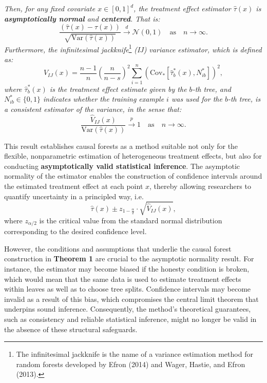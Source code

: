 \documentclass[
  12pt,
  a4paper,
  oneside]{article}
\begin{document}
\textit{Then, for any fixed covariate $x \in [0,1]^d$, the treatment effect estimator $\hat{\tau}(x)$ is \textbf{asymptotically normal} and \textbf{centered}. That is:}
\begin{equation} \label{eq:5}
\frac{\left(\hat{\tau}(x) - \tau(x)\right)}{\sqrt{\text{Var}\left(\hat{\tau}(x)\right)}} \xrightarrow{d} \mathcal{N}(0,1) \quad \text{as} \quad n \to \infty.
\end{equation}
\textit{Furthermore, the infinitesimal jackknife}\footnote{The
  infinitesimal jackknife is the name of a variance estimation method
  for random forests developed by Efron (2014) and Wager, Hastie, and
  Efron (2013).} \textit{(IJ) variance estimator, which is defined as:}
\begin{equation} \label{eq:6}
\hat{V}_{IJ}(x) = \frac{n-1}{n}\left(\frac{n}{n-s}\right)^2 \sum_{i=1}^{n} \left(\text{Cov}_{\ast}\left[\hat{\tau}^{\ast}_{b}(x), N_{ib}^{\ast}\right]\right)^2,
\end{equation}
\textit{where $\hat{\tau}^{\ast}_b(x)$ is the treatment effect estimate given by the $b$-th tree, and $N_{ib}^{\ast} \in \{0,1\}$ indicates whether the training example $i$ was used for the $b$-th tree, is a consistent estimator of the variance, in the sense that:}
\begin{equation} \label{eq:7}
\frac{\hat{V}_{IJ}(x)}{\text{Var}(\hat{\tau}(x))} \xrightarrow{p} 1
\quad \text{as} \quad n \to \infty.
\end{equation}

\qquad This result establishes causal forests as a method suitable not
only for the flexible, nonparametric estimation of heterogeneous
treatment effects, but also for conducting
\textbf{asymptotically valid statistical inference}. The asymptotic
normality of the estimator enables the construction of confidence
intervals around the estimated treatment effect at each point \(x\),
thereby allowing researchers to quantify uncertainty in a principled
way, i.e. \begin{equation} \label{eq:8}
\hat{\tau}(x) \pm z_{1 - \frac{\alpha}{2}} \cdot \sqrt{\hat{V}_{IJ}(x)},
\end{equation} where \(z_{\alpha/2}\) is the critical value from the
standard normal distribution corresponding to the desired confidence
level.

\qquad However, the conditions and assumptions that underlie the causal
forest construction in \textbf{Theorem 1} are crucial to the asymptotic
normality result. For instance, the estimator may become biased if the
honesty condition is broken, which would mean that the same data is used
to estimate treatment effects within leaves as well as to choose tree
splits. Confidence intervals may become invalid as a result of this
bias, which compromises the central limit theorem that underpins sound
inference. Consequently, the method's theoretical guarantees, such as
consistency and reliable statistical inference, might no longer be valid
in the absence of these structural safeguards.
\end{document}
